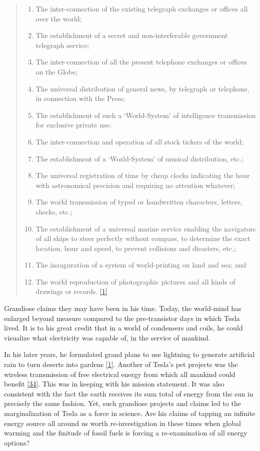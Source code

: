 \documentclass[
  12pt,
  british,
  a4paper,
  rgb,
  dvipsnames,
  svgnames,
  hyphens]{article}
\providecommand{\tightlist}{%
  \setlength{\itemsep}{0pt}\setlength{\parskip}{0pt}}
\begin{document}
\begin{quote}
\begin{enumerate}
\tightlist
\item
  The inter-connection of the existing telegraph exchanges or offices
  all over the world;
\item
  The establishment of a secret and non-interferable government
  telegraph service;
\item
  The inter-connection of all the present telephone exchanges or offices
  on the Globe;
\item
  The universal distribution of general news, by telegraph or telephone,
  in connection with the Press;
\item
  The establishment of such a `World-System' of intelligence
  transmission for exclusive private use;
\item
  The inter-connection and operation of all stock tickers of the world;
\item
  The establishment of a `World-System' of musical distribution, etc.;
\item
  The universal registration of time by cheap clocks indicating the hour
  with astronomical precision and requiring no attention whatever;
\item
  The world transmission of typed or handwritten characters, letters,
  checks, etc.;
\item
  The establishment of a universal marine service enabling the
  navigators of all ships to steer perfectly without compass, to
  determine the exact location, hour and speed, to prevent collisions
  and disasters, etc.;
\item
  The inauguration of a system of world-printing on land and sea; and
\item
  The world reproduction of photographic pictures and all kinds of
  drawings or records. \protect\hyperlink{ref-john83}{{[}1{]}}
\end{enumerate}
\end{quote}

Grandiose claims they may have been in his time. Today, the world-mind
has enlarged beyond measure compared to the pre-transistor days in which
Tesla lived. It is to his great credit that in a world of condensers and
coils, he could visualize what electricity was capable of, in the
service of mankind.

In his later years, he formulated grand plans to use lightning to
generate artificial rain to turn deserts into gardens
\protect\hyperlink{ref-john83}{{[}1{]}}. Another of Tesla's pet projects
was the wireless transmission of free electrical energy from which all
mankind could benefit \protect\hyperlink{ref-tesla-energy}{{[}34{]}}.
This was in keeping with his mission statement. It was also consistent
with the fact the earth receives its sum total of energy from the sun in
precisely the same fashion. Yet, such grandiose projects and claims led
to the marginalization of Tesla as a force in science. Are his claims of
tapping an infinite energy source all around us worth re-investigation
in these times when global warming and the finitude of fossil fuels is
forcing a re-examination of all energy options?
\end{document}

